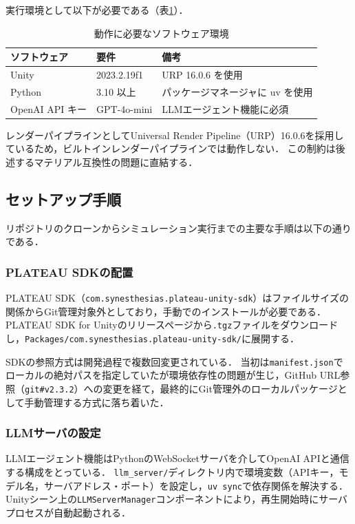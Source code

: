 \documentclass[a4paper,11pt]{jsarticle}
\begin{document}
実行環境として以下が必要である（表\ref{tab:requirements}）．

\begin{table}[htbp]
\centering
\caption{動作に必要なソフトウェア環境}
\label{tab:requirements}
\begin{tabularx}{\textwidth}{lXl}
\toprule
ソフトウェア & 要件 & 備考 \\
\midrule
Unity & 2023.2.19f1 & URP 16.0.6 を使用 \\
Python & 3.10 以上 & パッケージマネージャに uv を使用 \\
OpenAI API キー & GPT-4o-mini & LLMエージェント機能に必須 \\
\bottomrule
\end{tabularx}
\end{table}

レンダーパイプラインとしてUniversal Render Pipeline（URP）16.0.6を採用しているため，ビルトインレンダーパイプラインでは動作しない．
この制約は後述するマテリアル互換性の問題に直結する．

\subsection{セットアップ手順}

リポジトリのクローンからシミュレーション実行までの主要な手順は以下の通りである．

\subsubsection{PLATEAU SDKの配置}

PLATEAU SDK（\texttt{com.synesthesias.plateau-unity-sdk}）はファイルサイズの関係からGit管理対象外としており，手動でのインストールが必要である．
PLATEAU SDK for Unity\cite{plateausdk}のリリースページから\texttt{.tgz}ファイルをダウンロードし，\texttt{Packages/com.synesthesias.plateau-unity-sdk/}に展開する．

SDKの参照方式は開発過程で複数回変更されている．
当初は\texttt{manifest.json}でローカルの絶対パスを指定していたが環境依存性の問題が生じ，GitHub URL参照（\texttt{git\#v2.3.2}）への変更を経て，最終的にGit管理外のローカルパッケージとして手動管理する方式に落ち着いた．

\subsubsection{LLMサーバの設定}

LLMエージェント機能はPythonのWebSocketサーバを介してOpenAI APIと通信する構成をとっている．
\texttt{llm\_server/}ディレクトリ内で環境変数（APIキー，モデル名，サーバアドレス・ポート）を設定し，\texttt{uv sync}で依存関係を解決する．
Unityシーン上の\texttt{LLMServerManager}コンポーネントにより，再生開始時にサーバプロセスが自動起動される．
\end{document}

